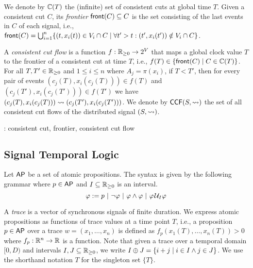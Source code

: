 We denote by $\mathbb{C}(T)$ the (infinite) set of consistent cuts at global time $T$.
Given a consistent cut $C$, its \emph{frontier} $\mathsf{front}(C) \subseteq C$ is the set consisting of the last events in $C$ of each signal, i.e., $\fr(C) = \bigcup_{i = 1}^{n} \{ (t, x_i(t)) \in V_i \cap C \st \forall t' > t : (t', x_i(t')) \notin V_i \cap C \}$.

A \emph{consistent cut flow} is a function $f : \mathbb{R}_{\geq 0} \to 2^V$ that maps a global clock value $T$ to the frontier of a consistent cut at time $T$, i.e., $f(T) \in \{\fr(C) \st C \in \CC(T)\}$.
For all $T,T' \in \mathbb{R}_{\geq 0}$ and $1 \leq i \leq n$ where $A_j = \pi(x_i)$, if $T < T'$, then for every pair of events $(c_j(T), x_i(c_j(T))) \in f(T)$ and $(c_j(T'), x_i(c_j(T'))) \in f(T')$ we have $(c_j(T), x_i(c_j(T))) \rightsquigarrow (c_j(T'), x_i(c_j(T')))$.
We denote by $\mathsf{CCF}(S,{\rightsquigarrow})$ the set of all consistent cut flows of the distributed signal $(S,{\rightsquigarrow})$.

\begin{example}
	\TODO: consistent cut, frontier, consistent cut flow
\end{example}


\subsection{Signal Temporal Logic} \label{sec:stl}
Let $\mathsf{AP}$ be a set of atomic propositions.
The syntax is given by the following grammar where $p \in \mathsf{AP}$ and $I \subseteq \mathbb{R}_{\geq 0}$ is an interval.
$$ \varphi :=  p ~|~ \lnot \varphi ~|~ \varphi \land \varphi ~|~ \varphi \kern.1em\mathcal{U}_I \varphi$$

A \emph{trace} is a vector of synchronous signals of finite duration.
We express atomic propositions as functions of trace values at a time point $T$, i.e., a proposition $p \in \mathsf{AP}$ over a trace $w = (x_1, \ldots, x_n)$ is defined as $f_p(x_1(T), \ldots, x_n(T)) > 0$ where $f_p : \mathbb{R}^n \to \mathbb{R}$ is a function. 
Note that given a trace over a temporal domain $[0,D)$ and intervals $I,J \subseteq \mathbb{R}_{\geq 0}$, we write $I \oplus J = \{i + j \st i \in I \land j \in J\}$.
We use the shorthand notation $T$ for the singleton set $\{T\}$. 

